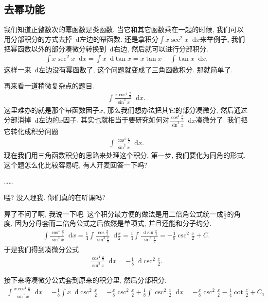 \documentclass{ctexbook}
\newcommand*{\dif}{\mathop{}\!\mathrm{d}}
\begin{document}
{\subsection{去幂功能}
我们知道正整数次的幂函数是\uppercase\expandafter{}类函数, 当它和其它函数乘在一起的时候, 我们可以用分部积分的方式去掉$\dif$左边的幂函数. 还是拿积分$\int x\sec^{2}{x}\dif{x}$来举例子, 我们把幂函数以外的部分凑微分转换到$\dif$右边, 然后就可以进行分部积分. 
\begin{align*}
\int x\sec^{2}{x}\dif{x}=\int x\dif{\tan{x}}=x\tan{x}-\int\tan{x}\dif{x}
.\end{align*}
这样一来$\dif$左边没有幂函数了, 这个问题就变成了三角函数积分. 那就简单了. \par
再来看一道稍微复杂点的题目. 
\begin{align*}
\int\frac{x\cos^{4}{\frac{x}{2}}}{\sin^{3}{x}}\dif{x}
.\end{align*}
这里难办的就是那个幂函数因子$x$, 那么我们想办法把其它的部分凑微分, 然后通过分部消掉$\dif$左边的$x$因子. 其实也就相当于要研究如何对$\frac{\cos^{4}{\frac{x}{2}}}{\sin^{3}{x}}\dif{x}$凑微分了. 我们把它转化成积分问题
\begin{align*}
\int\frac{\cos^{4}{\frac{x}{2}}}{\sin^{3}{x}}\dif{x}
.\end{align*}
现在我们用三角函数积分的思路来处理这个积分. 第一步, 我们要化为同角的形式. 这个题怎么化比较容易呢, 有人开麦回答一下吗? \par
……\par
喂? 没人理我. 你们真的在听课吗? \par
算了不问了啊, 我说一下吧. 这个积分最方便的做法是用二倍角公式统一成$\frac{x}{2}$的角度, 因为分母套而二倍角公式之后依然是单项式, 并且还能和分子约分. 
\begin{align*}
\int\frac{\cos^{4}{\frac{x}{2}}}{\sin^{3}{x}}\dif{x}=\frac{1}{4}\int\frac{\cos{\frac{x}{2}}}{\sin^{3}{\frac{x}{2}}}\dif{\frac{x}{2}}=\frac{1}{4}\int\frac{\dif{\sin{\frac{x}{2}}}}{\sin^{3}{\frac{x}{2}}}=-\frac{1}{8}\csc^{2}{\frac{x}{2}}+C
.\end{align*}
于是我们得到凑微分公式
\begin{align*}
\frac{\cos^{4}{\frac{x}{2}}}{\sin^{3}{x}}\dif{x}=-\frac{1}{8}\dif{\csc^{2}{\frac{x}{2}}}
.\end{align*}\par
接下来将凑微分公式套到原来的积分里, 然后分部积分. 
\begin{align*}
\int\frac{x\cos^{4}{\frac{x}{2}}}{\sin^{3}{x}}\dif{x}=-\frac{1}{8}\int x\dif{\csc^{2}{\frac{x}{2}}}=-\frac{x}{8}\csc^{2}{\frac{x}{2}}+\frac{1}{8}\int\csc^{2}{\frac{x}{2}}\dif{x}=-\frac{x}{8}\csc^{2}{\frac{x}{2}}-\frac{1}{4}\cot{\frac{x}{2}}+C_{1}

\end{align*}}
\end{document}
